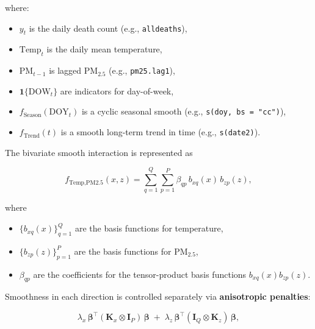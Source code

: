 \documentclass[
  letterpaper,
  DIV=11,
  numbers=noendperiod]{scrreprt}
\providecommand{\tightlist}{%
  \setlength{\itemsep}{0pt}\setlength{\parskip}{0pt}}\usepackage{longtable,booktabs,array}
\begin{document}
where:

\begin{itemize}
\tightlist
\item
  \(y_t\) is the daily death count (e.g., \texttt{alldeaths}),\\
\item
  \(\text{Temp}_t\) is the daily mean temperature,\\
\item
  \(\text{PM}_{t-1}\) is lagged PM\(_{2.5}\) (e.g.,
  \texttt{pm25.lag1}),\\
\item
  \(\mathbf{1}\{\text{DOW}_t\}\) are indicators for day-of-week,\\
\item
  \(f_{\text{Season}}(\text{DOY}_t)\) is a cyclic seasonal smooth (e.g.,
  \texttt{s(doy,\ bs\ =\ "cc")}),\\
\item
  \(f_{\text{Trend}}(t)\) is a smooth long-term trend in time (e.g.,
  \texttt{s(date2)}).
\end{itemize}

The bivariate smooth interaction is represented as

\[
f_{\text{Temp,PM2.5}}(x, z)
=
\sum_{q=1}^{Q} \sum_{p=1}^{P}
\beta_{qp}\, b_{xq}(x)\, b_{zp}(z),
\]

where

\begin{itemize}
\tightlist
\item
  \(\{b_{xq}(x)\}_{q=1}^{Q}\) are the basis functions for temperature,\\
\item
  \(\{b_{zp}(z)\}_{p=1}^{P}\) are the basis functions for
  PM\(_{2.5}\),\\
\item
  \(\beta_{qp}\) are the coefficients for the tensor-product basis
  functions \(b_{xq}(x) b_{zp}(z)\).
\end{itemize}

Smoothness in each direction is controlled separately via
\textbf{anisotropic penalties}:

\[
\lambda_x\, \boldsymbol{\beta}^\top (\mathbf{K}_x \otimes \mathbf{I}_{P})\, \boldsymbol{\beta}
\;+\;
\lambda_z\, \boldsymbol{\beta}^\top (\mathbf{I}_{Q} \otimes \mathbf{K}_z)\, \boldsymbol{\beta},
\]
\end{document}
